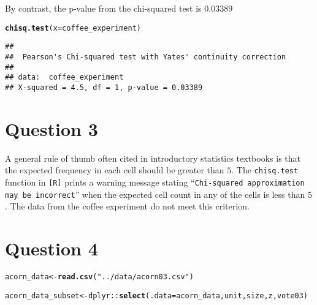 \documentclass[11pt]{article}\usepackage[]{graphicx}\usepackage[]{color}
\makeatletter
\newcommand{\hlstr}[1]{\textcolor[rgb]{0.192,0.494,0.8}{#1}}%
\newcommand{\hlopt}[1]{\textcolor[rgb]{0,0,0}{#1}}%
\newcommand{\hlstd}[1]{\textcolor[rgb]{0.345,0.345,0.345}{#1}}%
\newcommand{\hlkwb}[1]{\textcolor[rgb]{0.69,0.353,0.396}{#1}}%
\newcommand{\hlkwc}[1]{\textcolor[rgb]{0.333,0.667,0.333}{#1}}%
\newcommand{\hlkwd}[1]{\textcolor[rgb]{0.737,0.353,0.396}{\textbf{#1}}}%
\newenvironment{kframe}{%
 \def\at@end@of@kframe{}%
 \ifinner\ifhmode%
  \def\at@end@of@kframe{\end{minipage}}%
  \begin{minipage}{\columnwidth}%
 \fi\fi%
 \def\FrameCommand##1{\hskip\@totalleftmargin \hskip-\fboxsep
 \colorbox{shadecolor}{##1}\hskip-\fboxsep
     \hskip-\linewidth \hskip-\@totalleftmargin \hskip\columnwidth}%
 \MakeFramed {\advance\hsize-\width
   \@totalleftmargin\z@ \linewidth\hsize
   \@setminipage}}%
 {\par\unskip\endMakeFramed%
 \at@end@of@kframe}
\newenvironment{knitrout}{}{} %
\theoremstyle{newstyle}
\makeatother
\begin{document}
By contrast, the p-value from the chi-squared test is $0.03389$

\begin{knitrout}
\color{fgcolor}\begin{kframe}
\begin{alltt}
\hlkwd{chisq.test}\hlstd{(}\hlkwc{x} \hlstd{= coffee_experiment)}
\end{alltt}


{\ttfamily\noindent\color{warningcolor}{\#\# Warning in chisq.test(x = coffee\_experiment): Chi-squared approximation may be incorrect}}\begin{verbatim}
## 
## 	Pearson's Chi-squared test with Yates' continuity correction
## 
## data:  coffee_experiment
## X-squared = 4.5, df = 1, p-value = 0.03389
\end{verbatim}
\end{kframe}
\end{knitrout}

\section{Question 3}

A general rule of thumb often cited in introductory statistics textbooks is that the expected frequency in each cell should be greater than $5$. The \texttt{chisq.test} function in \texttt{[R]} prints a warning message stating ``\texttt{Chi-squared approximation may be incorrect}'' when the expected cell count in any of the cells is less than $5$. The data from the coffee experiment do not meet this criterion.

\section{Question 4}

\begin{knitrout}
\color{fgcolor}\begin{kframe}
\begin{alltt}
\hlstd{acorn_data} \hlkwb{<-} \hlkwd{read.csv}\hlstd{(}\hlstr{"../data/acorn03.csv"}\hlstd{)}

\hlstd{acorn_data_subset} \hlkwb{<-} \hlstd{dplyr}\hlopt{::}\hlkwd{select}\hlstd{(}\hlkwc{.data} \hlstd{= acorn_data, unit, size, z, vote03)}
\end{alltt}
\end{kframe}
\end{knitrout}
\end{document}
